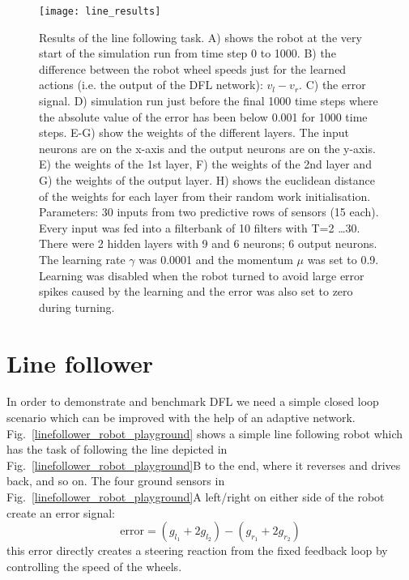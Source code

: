 \documentclass{aamas2018}
\begin{document}
\begin{figure}[!ht]
  \centering
  \texttt{[image: line\_results]}
  \caption{Results of the line following task. A) shows the robot at
    the very start of the simulation run from time step 0 to 1000. B)
    the difference between the robot wheel speeds just for the learned
    actions (i.e. the output of the DFL network): $v_l-v_r$.  C) the
    error signal.  D) simulation run just before the final 1000 time
    steps where the absolute value of the error has been below 0.001
    for 1000 time steps. E-G) show the weights of the different
    layers. The input neurons are on the x-axis and the output neurons
    are on the y-axis.  E) the weights of the 1st layer, F) the
    weights of the 2nd layer and G) the weights of the output layer.
    H) shows the euclidean distance of the weights for each layer from
    their random work initialisation. Parameters: 30 inputs from two
    predictive rows of sensors (15 each). Every input was fed into a
    filterbank of 10 filters with T=2 \ldots 30. There were 2 hidden
    layers with 9 and 6 neurons; 6 output neurons. The learning rate $\gamma$
    was 0.0001 and the momentum $\mu$ was set to 0.9. Learning was disabled
    when the robot turned to avoid large error spikes caused by the learning
    and the error was also set to zero during turning.
    \label{line_results}}
\end{figure}








\section{Line follower}
In order to demonstrate and benchmark DFL we need a simple closed loop scenario
which can be improved with the help of an adaptive network.
Fig.~\ref{linefollower_robot_playground} shows a simple line following
robot which has the task of following the line depicted in
Fig.~\ref{linefollower_robot_playground}B to the end, where it
reverses and drives back, and so on. The four ground sensors in
Fig.~\ref{linefollower_robot_playground}A left/right on either side
of the robot create an error signal:
\begin{equation}
\mathrm{error} = (g_{l_1}+2 g_{l_2})-(g_{r_1}+2 g_{r_2}) \label{line_error}
\end{equation}
this error directly creates a steering reaction from the fixed
feedback loop by controlling the speed of the wheels.
\end{document}

